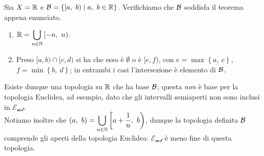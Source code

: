 \begin{example}
Sia $X=\mathbb{R}$ e $\basis=\left\{[a,\ b)\mid a,\ b\in\realset\right\}$. Verifichiamo che $\mathcal{B}$ soddisfa il teorema appena enunciato.
\begin{enumerate}
\item $\displaystyle\mathbb{R}=\mathop{{\bigcup}}\displaylimits_{n\in \mathbb{N}}\left[-n,\ n\right)$.
\item Preso $[a, b)\cap[c, d)$ si ha che esso è $\emptyset$ o è $[e, f)$, con $e=\max\left\{a,\ c\right\}$, $f=\min\left\{b,\ d\right\}$; in entrambi i casi l'intersezione è elemento di $\mathcal{B}$.
\end{enumerate}
Esiste dunque una topologia su $\mathbb{R}$ che ha base $\mathcal{B}$; questa \textit{non} è base per la topologia Euclidea, ad esempio, dato che gli intervalli semiaperti non sono inclusi in $\mathcal{E_{ucl}}$.\\
Notiamo inoltre che $\displaystyle\left(a,\ b\right)=\union_{n\in \naturalset}\left[a+\frac{1}{n},\ b\right)$, dunque la topologia definita $\mathcal{B}$ comprende gli aperti della topologia Euclidea: $\mathcal{E_{ucl}}$ è meno fine di questa topologia.
\end{example}
